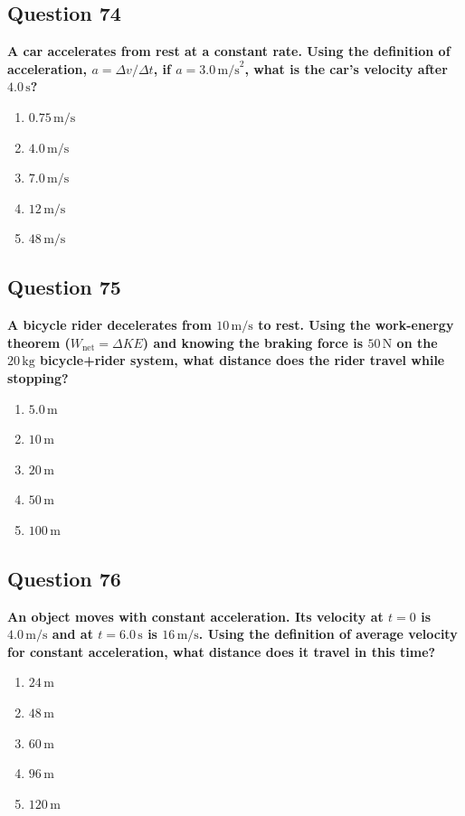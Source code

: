 \documentclass[12pt,letterpaper]{article}
\begin{document}
\subsection{Question 74}

\begin{questionbox}
\textbf{A car accelerates from rest at a constant rate. Using the definition of acceleration, $a = \Delta v / \Delta t$, if $a = 3.0\,\text{m/s}^2$, what is the car's velocity after $4.0\,\text{s}$?}

\begin{enumerate}[label=\alph*)]
    \item $0.75\,\text{m/s}$
    \item $4.0\,\text{m/s}$
    \item $7.0\,\text{m/s}$
    \item $12\,\text{m/s}$
    \item $48\,\text{m/s}$
\end{enumerate}
\end{questionbox}

\subsection{Question 75}

\begin{questionbox}
\textbf{A bicycle rider decelerates from $10\,\text{m/s}$ to rest. Using the work-energy theorem ($W_{\text{net}} = \Delta KE$) and knowing the braking force is $50\,\text{N}$ on the $20\,\text{kg}$ bicycle+rider system, what distance does the rider travel while stopping?}

\begin{enumerate}[label=\alph*)]
    \item $5.0\,\text{m}$
    \item $10\,\text{m}$
    \item $20\,\text{m}$
    \item $50\,\text{m}$
    \item $100\,\text{m}$
\end{enumerate}
\end{questionbox}

\subsection{Question 76}

\begin{questionbox}
\textbf{An object moves with constant acceleration. Its velocity at $t = 0$ is $4.0\,\text{m/s}$ and at $t = 6.0\,\text{s}$ is $16\,\text{m/s}$. Using the definition of average velocity for constant acceleration, what distance does it travel in this time?}

\begin{enumerate}[label=\alph*)]
    \item $24\,\text{m}$
    \item $48\,\text{m}$
    \item $60\,\text{m}$
    \item $96\,\text{m}$
    \item $120\,\text{m}$
\end{enumerate}
\end{questionbox}
\end{document}
